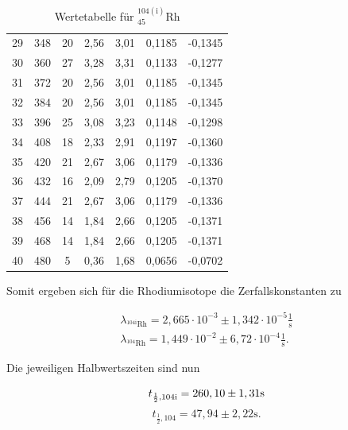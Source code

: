 \begin{table}[H]
\begin{tabular}{c|c|c|c|c|c|c}
29&	348&	20&	2,56&	3,01&	0,1185&	-0,1345\\
30&	360&	27&	3,28&	3,31&	0,1133&	-0,1277\\
31&	372&	20&	2,56&	3,01&	0,1185&	-0,1345\\
32&	384&	20&	2,56&	3,01&	0,1185&	-0,1345\\
33&	396&	25&	3,08&	3,23&	0,1148&	-0,1298\\
34&	408&	18&	2,33&	2,91&	0,1197&	-0,1360\\
35&	420&	21&	2,67&	3,06&	0,1179&	-0,1336\\
36&	432&	16&	2,09&	2,79&	0,1205&	-0,1370\\
37&	444&	21&	2,67&	3,06&	0,1179&	-0,1336\\
38&	456&	14&	1,84&	2,66&	0,1205&	-0,1371\\
39&	468&	14&	1,84&	2,66&	0,1205&	-0,1371\\
40&	480&	5&	0,36&	1,68&	0,0656&	-0,0702\\
\end{tabular}
\caption{Wertetabelle für $^{104(\text{i})}_{45}$Rh}
\end{table}
\renewcommand{\arraystretch}{1}

Somit ergeben sich für die Rhodiumisotope die Zerfallskonstanten zu

\begin{align}
\lambda_{^{104\text{i}}\text{Rh}} = 2,665\cdot 10^{-3} \pm 1,342 \cdot 10^{-5} \frac{1}{\text{s}}\\
\lambda_{^{104}\text{Rh}} = 1,449 \cdot 10^{-2} \pm  6,72 \cdot 10^{-4} \frac{1}{\text{s}}.
\end{align}

Die jeweiligen Halbwertszeiten sind nun

\begin{equation}
   t_{\frac12,\text{104i}} = 260,10 \pm 1,31 \text{s}\\
\label{rh1}
\end{equation}
\begin{equation}
 t_{\frac12,\text{104}} = 47,94 \pm 2,22 \text{s}.
 \label{rh2}
\end{equation}

